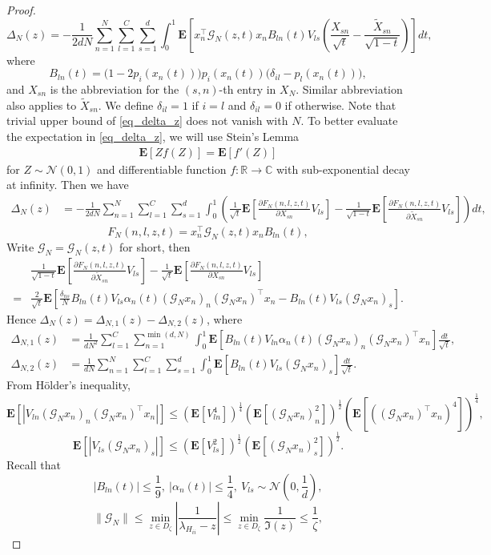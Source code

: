 \documentclass{article}
\newcommand{\E}{\mathbf{E}}
\newcommand{\mb}{\mathbb}
\newcommand\ml{\mathcal}
\newcommand\pl{\partial}
\newcommand{\wt}{\widetilde}
\newcommand{\rw}{\rightarrow}
\newcommand{\1}{^{(1)}}
\newcommand{\2}{^{(2)}}
\renewcommand{\l}{\left}
\renewcommand{\r}{\right}
\newcommand{\be}{\begin{equation}}
\newcommand{\ee}{\end{equation}}
\newcommand{\bea}{\begin{equation}\begin{aligned}}
\newcommand{\eea}{\end{aligned}\end{equation}}
\begin{document}
\begin{proof}
    \be \label{eq_delta_z}
    \Delta_N(z)=-\frac{1}{2dN}\sum_{n=1}^N\sum_{l=1}^C\sum_{s=1}^d\int_0^1\E\l[x_n^\top \ml{G}_N(z,t)x_n B_{ln}(t)V_{ls}\l(\frac{X_{sn}}{\sqrt{t}}-\frac{\wt{X}_{sn}}{\sqrt{1-t}}\r)\r]dt,
    \ee
    where
    $$
    B_{ln}(t)=\Big(1-2p_i(x_n(t))\Big)p_i(x_n(t))\Big(\delta_{il}-p_l(x_n(t))\Big),
    $$
    and $X_{sn}$ is the abbreviation for the $(s,n)$-th entry in $X_N$. Similar abbreviation also applies to $\wt{X}_{sn}$. We define $\delta_{il} = 1$ if $i =l$ and $\delta_{il} = 0$ if otherwise. Note that trivial upper bound of \eqref{eq_delta_z} does not vanish with $N$.
    To better evaluate the expectation in \eqref{eq_delta_z}, we will use Stein's Lemma
    \bea\label{SteinLemma}
    \E[Zf(Z)]=\E[f'(Z)]
    \eea
    for $Z\sim \ml{N}(0,1)$ and differentiable function $f:\mb{R}\rw\mb{C}$ with sub-exponential decay at infinity.
    Then we have
    \bea
    \Delta_N(z)&=-\frac{1}{2dN}\sum_{n=1}^N\sum_{l=1}^C\sum_{s=1}^d\int_0^1\l(\frac{1}{\sqrt{t}}\E\l[\frac{\pl F_N(n,l,z,t)}{\pl X_{sn}}V_{ls}\r]-\frac{1}{\sqrt{1-t}}\E\l[\frac{\pl F_N(n,l,z,t)}{\pl \wt{X}_{sn}}V_{ls}\r]\r)dt,
    \eea
    $$
    F_N(n,l,z,t)=x_n^\top \ml{G}_N(z,t)x_n B_{ln}(t),
    $$
    Write $\ml{G}_N=\ml{G}_N(z,t)$ for short, then
        \bea
    &\frac{1}{\sqrt{1-t}}\E\l[\frac{\pl F_N(n,l,z,t)}{\pl \wt{X}_{sn}}V_{ls}\r] - \frac{1}{\sqrt{t}}\E\l[\frac{\pl F_N(n,l,z,t)}{\pl X_{sn}}V_{ls}\r]\\
    =&\frac{2}{\sqrt{t}}\E\l[\frac{\delta_{ns}}{N}B_{ln}(t)V_{ls}\alpha_n(t)(\ml{G}_Nx_n)_n(\ml{G}_Nx_n)^\top x_n - B_{ln}(t)V_{ls}(\ml{G}_Nx_n)_s\r].
    \eea
    Hence $\Delta_N(z)=\Delta_{N,1}(z)-\Delta_{N,2}(z)$, where
    \bea
    \Delta_{N,1}(z)&=\frac{1}{dN^2}\sum_{l=1}^C\sum_{n=1}^{\min(d,N)}\int_0^1\E\l[B_{ln}(t)V_{ln}\alpha_n(t)(\ml{G}_Nx_n)_n(\ml{G}_Nx_n)^\top x_n\r]\frac{dt}{\sqrt{t}},\\
    \Delta_{N,2}(z)&=\frac{1}{dN}\sum_{n=1}^N\sum_{l=1}^C\sum_{s=1}^d\int_0^1\E\l[B_{ln}(t)V_{ls}(\ml{G}_Nx_n)_s\r]\frac{dt}{\sqrt{t}}.
    \eea
    From Hölder's inequality,
    $$
    \E[|V_{ln}(\ml{G}_Nx_n)_n(\ml{G}_Nx_n)^\top x_n|]\leq \l(\E[V_{ln}^4]\r)^{\frac{1}{4}}\l(\E[(\ml{G}_Nx_n)_n^2]\r)^\frac{1}{2}\l(\E[((\ml{G}_Nx_n)^\top x_n)^4]\r)^\frac{1}{4},
    $$
    $$
    \E[|V_{ls}(\ml{G}_Nx_n)_s|]\leq \l(\E[V_{ls}^2]\r)^{\frac{1}{2}}\l(\E[(\ml{G}_Nx_n)_s^2]\r)^{\frac{1}{2}}.
    $$
   Recall that
$$|B_{ln}(t)|\leq \frac{1}{9},\ |\alpha_n(t)|\leq \frac{1}{4},\ V_{ls}\sim\ml{N}(0,\frac{1}{d}),$$
$$\|\ml{G}_N\|\leq \min_{z \in D_\zeta} \left|\frac{1}{\lambda_{H_{ii}} - z}\right| \leq \min_{z \in D_\zeta}  \frac{1}{\Im (z)}\leq \frac{1}{\zeta},$$


\end{proof}
\end{document}
